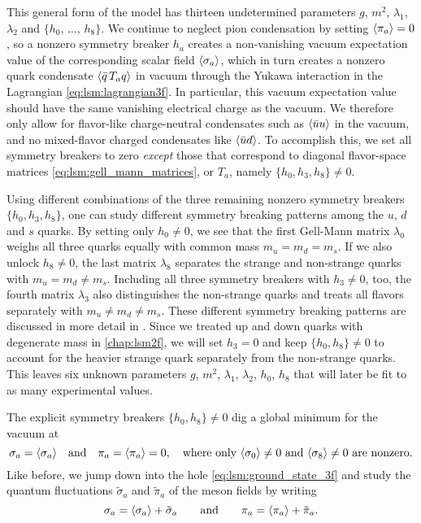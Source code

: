 This general form of the model has thirteen undetermined parameters $g$, $m^2$, $\lambda_1$, $\lambda_2$ and $\{h_0,\,\ldots,\,h_8\}$.
We continue to neglect pion condensation by setting $\langle \pi_a \rangle=0$,
so a nonzero symmetry breaker $h_a$ creates a non-vanishing vacuum expectation value of the corresponding scalar field $\langle \sigma_a \rangle$,
which in turn creates a nonzero quark condensate $\langle \bar{q} \, T_a q \rangle$ in vacuum through the Yukawa interaction in the Lagrangian \eqref{eq:lsm:lagrangian3f}.
In particular, this vacuum expectation value should have the same vanishing electrical charge as the vacuum.
We therefore only allow for flavor-like charge-neutral condensates such as $\langle \bar{u} u \rangle$ in the vacuum,
and no mixed-flavor charged condensates like $\langle \bar{u} d \rangle$.
To accomplish this, we set all symmetry breakers to zero \emph{except} those that correspond to diagonal flavor-space matrices \eqref{eq:lsm:gell_mann_matrices},
or $T_a$,
namely $\{h_0,h_3,h_8\} \neq 0$.

Using different combinations of the three remaining nonzero symmetry breakers $\{h_0,h_3,h_8\}$,
one can study different symmetry breaking patterns among the $u$, $d$ and $s$ quarks.
By setting only $h_0 \neq 0$, we see that the first Gell-Mann matrix $\lambda_0$ weighs all three quarks equally with common mass $m_u=m_d=m_s$.
If we also unlock $h_8 \neq 0$, the last matrix $\lambda_8$ separates the strange and non-strange quarks with $m_u = m_d \neq m_s$.
Including all three symmetry breakers with $h_3 \neq 0$, too, the fourth matrix $\lambda_3$ also distinguishes the non-strange quarks and treats all flavors separately with $m_u \neq m_d \neq m_s$.
These different symmetry breaking patterns are discussed in more detail in \cite[section III]{ref:lsm3f_details}.
Since we treated up and down quarks with degenerate mass in \cref{chap:lsm2f},
we will set $h_3 = 0$ and keep $\{h_0,h_8\} \neq 0$ to account for the heavier strange quark separately from the non-strange quarks.
This leaves six unknown parameters $g$, $m^2$, $\lambda_1$, $\lambda_2$, $h_0$, $h_8$ that will later be fit to as many experimental values.

The explicit symmetry breakers $\{h_0,h_8\}\neq 0$ dig a global minimum for the vacuum at
\begin{equation}
	\sigma_a = \langle \sigma_a \rangle \quad \text{and} \quad \pi_a = \langle \pi_a \rangle = 0, \quad \text{where only $\langle \sigma_0 \rangle \neq 0$ and $\langle \sigma_8 \rangle \neq 0$ are nonzero.}
\label{eq:lsm:ground_state_3f}
\end{equation}
Like before, we jump down into the hole \eqref{eq:lsm:ground_state_3f} and study the quantum fluctuations $\tilde{\sigma}_a$ and $\tilde{\pi}_a$ of the meson fields by writing
\begin{equation}
	\sigma_a = \langle \sigma_a \rangle + \tilde{\sigma}_a
	\qquad \text{and} \qquad
	\pi_a = \langle \pi_a \rangle + \tilde{\pi}_a.
\end{equation}

